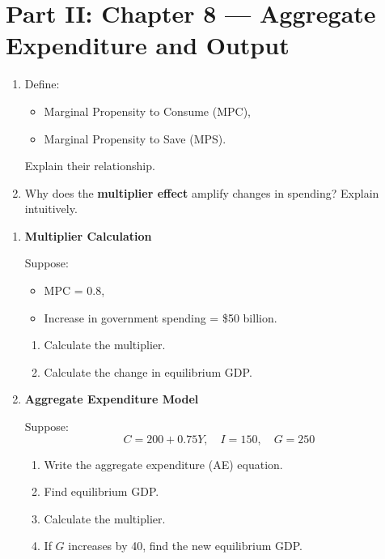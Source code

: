 \documentclass[12pt]{article}
\begin{document}
\section*{Part II: Chapter 8 — Aggregate Expenditure and Output}


\begin{enumerate}[label=\textbf{\arabic*.}, start=7]

\item Define:
\begin{itemize}
    \item Marginal Propensity to Consume (MPC),
    \item Marginal Propensity to Save (MPS).
\end{itemize}
Explain their relationship.

\item Why does the \textbf{multiplier effect} amplify changes in spending? 
Explain intuitively.

\end{enumerate}


\begin{enumerate}[label=\textbf{\arabic*.}, start=9]

\item \textbf{Multiplier Calculation}

Suppose:
\begin{itemize}
    \item MPC = 0.8,
    \item Increase in government spending = \$50 billion.
\end{itemize}

\begin{enumerate}
    \item[(a)] Calculate the multiplier.
    \item[(b)] Calculate the change in equilibrium GDP.
\end{enumerate}

\item \textbf{Aggregate Expenditure Model}

Suppose:
\[
C = 200 + 0.75Y, \quad I = 150, \quad G = 250
\]

\begin{enumerate}
    \item[(a)] Write the aggregate expenditure (AE) equation.
    \item[(b)] Find equilibrium GDP.
    \item[(c)] Calculate the multiplier.
    \item[(d)] If \(G\) increases by 40, find the new equilibrium GDP.
\end{enumerate}

\end{enumerate}
\end{document}
